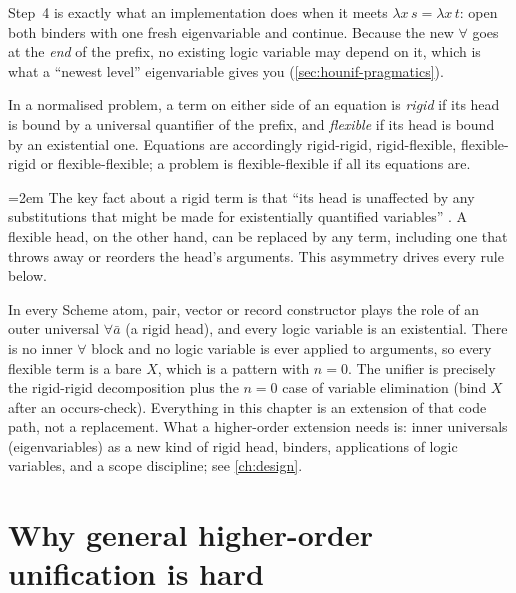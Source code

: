 \begin{remark}
Step~4 is exactly what an implementation does when it meets $\lambda x\,s=\lambda x\,t$: open both binders
with one fresh eigenvariable and continue. Because the new $\forall$ goes at the \emph{end} of the prefix, no
existing logic variable may depend on it, which is what a \enquote{newest level} eigenvariable gives you
(\cref{sec:hounif-pragmatics}).
\end{remark}

\begin{definition}\label{def:hounif-rigid}
In a normalised problem, a term on either side of an equation is \emph{rigid} if its head is bound by a
universal quantifier of the prefix, and \emph{flexible} if its head is bound by an existential one. Equations
are accordingly rigid-rigid, rigid-flexible, flexible-rigid or flexible-flexible; a problem is
flexible-flexible if all its equations are.
\end{definition}

{\emergencystretch=2em
The key fact about a rigid term is that \enquote{its head is unaffected by any substitutions that might be made
for existentially quantified variables} . A flexible head, on the other hand, can be replaced by any
term, including one that throws away or reorders the head's arguments. This asymmetry drives every rule
below.\par}

\begin{kanren}
In \micro{} every Scheme atom, pair, vector or record constructor plays the role of an outer
universal $\forall\bar a$ (a rigid head), and every logic variable is an existential. There is no inner
$\forall$ block and no logic variable is ever applied to arguments, so every flexible term is a bare $X$, which
is a pattern with $n=0$. The unifier  is precisely the rigid-rigid decomposition
plus the $n=0$ case of variable elimination (bind $X$ after an occurs-check). Everything in this chapter is an
extension of that code path, not a replacement. What a higher-order extension needs is: inner universals
(eigenvariables) as a new kind of rigid head, binders, applications of logic variables, and a scope
discipline; see \cref{ch:design}.
\end{kanren}

\section{Why general higher-order unification is hard}\label{sec:hounif-hard}

